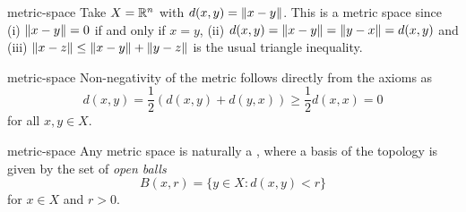 \begin{example}{metric-space}
    Take $X = \mathbb{R}^n$ with $d(x, y) = \left\|x - y\right\|$. This is a metric space since (i) $\left\|x - y\right\| = 0$ if and only if $x = y$, (ii) $d(x, y) = \left\|x - y\right\| = \left\|y - x\right\| = d(x, y)$ and (iii) $\left\|x - z\right\| \le \left\|x - y\right\| + \left\|y - z\right\|$ is the usual triangle inequality.
\end{example}

\begin{example}{metric-space}
    Non-negativity of the metric follows directly from the axioms as
    \[ d(x, y) = \frac{1}{2} (d(x, y) + d(y, x)) \ge \frac{1}{2} d(x, x) = 0 \]
    for all $x, y \in X$.
\end{example}

\begin{example}{metric-space}
    Any metric space is naturally a , where a basis of the topology is given by the set of \textit{open balls}
    \[ B(x, r) = \{ y \in X : d(x, y) < r \} \]
    for $x \in X$ and $r > 0$.
\end{example}
